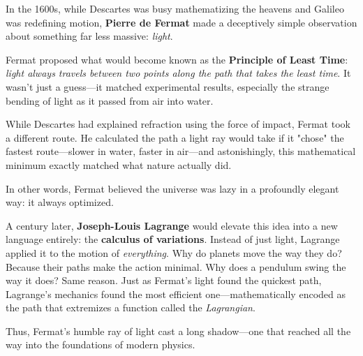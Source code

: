 \begin{tcolorbox}[title={\textbf{Historical Sidebar: Fermat and the Wisdom of Light}}, colback=gray!5, colframe=black, fonttitle=\bfseries]

    In the 1600s, while Descartes was busy mathematizing the heavens and Galileo was redefining motion, \textbf{Pierre de Fermat} made a deceptively simple observation about something far less massive: \emph{light}.
    
    Fermat proposed what would become known as the \textbf{Principle of Least Time}: \emph{light always travels between two points along the path that takes the least time}. It wasn’t just a guess—it matched experimental results, especially the strange bending of light as it passed from air into water.
    
    While Descartes had explained refraction using the force of impact, Fermat took a different route. He calculated the path a light ray would take if it "chose" the fastest route—slower in water, faster in air—and astonishingly, this mathematical minimum exactly matched what nature actually did.
    
    In other words, Fermat believed the universe was lazy in a profoundly elegant way: it always optimized.
    
    A century later, \textbf{Joseph-Louis Lagrange} would elevate this idea into a new language entirely: the \textbf{calculus of variations}. Instead of just light, Lagrange applied it to the motion of \emph{everything}. Why do planets move the way they do? Because their paths make the action minimal. Why does a pendulum swing the way it does? Same reason. Just as Fermat’s light found the quickest path, Lagrange’s mechanics found the most efficient one—mathematically encoded as the path that extremizes a function called the \textit{Lagrangian}.
    
    Thus, Fermat’s humble ray of light cast a long shadow—one that reached all the way into the foundations of modern physics.
    
\end{tcolorbox}

    